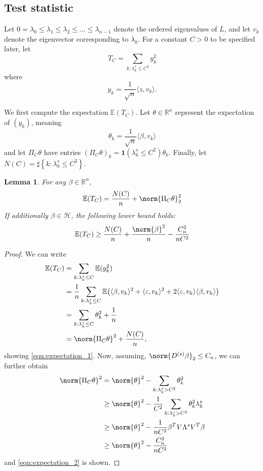 \documentclass{article}
\newcommand{\Reals}{\mathbb{R}}
\newcommand{\set}[1]{\left\{#1\right\}}
\newcommand{\dotp}[2]{\langle #1, #2 \rangle}
\newcommand{\1}{\mathbf{1}}
\newcommand{\Ebb}{\mathbb{E}}
\theoremstyle{alden}
\theoremstyle{aldenthm}
\newtheorem{lemma}{Lemma}
\theoremstyle{definition}
\theoremstyle{remark}
\begin{document}
\subsection{Test statistic}
Let $0 = \lambda_0 \leq \lambda_1 \leq \lambda_2 \leq \ldots \leq \lambda_{n - 1}$ denote the ordered eigenvalues of $L$, and let $v_k$ denote the eigenvector corresponding to $\lambda_k$. For a constant $C > 0$ to be specified later, let 
\begin{equation*}
T_C = \sum_{k: \lambda_k^{s} \leq C^2} y_k^2
\end{equation*}
where
\begin{equation*}
y_k = \frac{1}{\sqrt{n}} \dotp{z}{v_k}.
\end{equation*}

We first compute the expectation $\Ebb(T_C)$. Let $\theta \in \Reals^n$ represent the expectation of $(y_k)$, meaning
\begin{equation*}
\theta_k = \frac{1}{\sqrt{n}}\dotp{\beta}{v_k}
\end{equation*}
and let $\Pi_C\theta$ have entries $(\Pi_C \theta)_k = \1(\lambda_k^{s} \leq C^2) \theta_k$. Finally, let $N(C) = \sharp\set{k: \lambda_k^{s} \leq C^2}$. 

\begin{lemma}
	\label{lem:expectation}
	For any $\beta \in \Reals^n$,
	\begin{equation}
	\label{eqn:expectation_1}
	\Ebb(T_C) = \frac{N(C)}{n} + \norm{\Pi_C \theta}_2^2 
	\end{equation}
	If additionally $\beta \in \mathcal{H}$, the following lower bound holds:
	\begin{equation}
	\label{eqn:expectation_2}
	\Ebb(T_C) \geq \frac{N(C)}{n} + \frac{\norm{\beta}^2}{n}  - \frac{C_n^2}{nC^{2}}
	\end{equation}
\end{lemma}
\begin{proof}
	We can write
	\begin{align*}
	\Ebb(T_C) & = \sum_{k: \lambda_k^s \leq C} \Ebb(y_k^2) \\
	& = \frac{1}{n}\sum_{k: \lambda_k^s \leq C} \Ebb\bigl(\dotp{\beta}{v_k}^2 + \dotp{\varepsilon}{v_k}^2 + 2 \dotp{\varepsilon}{v_k} \dotp{\beta}{v_k}\bigr) \\
	& = \sum_{k: \lambda_k^s \leq C}\theta_k^2 + \frac{1}{n} \\
	& = \norm{\Pi_C \theta}^2 + \frac{N(C)}{n},
	\end{align*}
	showing \eqref{eqn:expectation_1}. Now, assuming, $\norm{D^{(s)}\beta}_2 \leq C_n$, we can further obtain
	\begin{align*}
	\norm{\Pi_C \theta}^2 & = \norm{\theta}^2 - \sum_{k:\lambda_k^s > C^2} \theta_k^2 \\
	& \geq \norm{\theta}^2 - \frac{1}{C^{2}}\sum_{k:\lambda_k^s > C^2} \theta_k^2 \lambda_k^s \\
	& \geq \norm{\theta}^2 -\frac{1}{nC^2} \beta^T V \Lambda^s V^T \beta \\
	& \geq \norm{\theta}^2  - \frac{C_n^2}{nC^{2}}
	\end{align*}
	and \eqref{eqn:expectation_2} is shown.
\end{proof}
\end{document}
